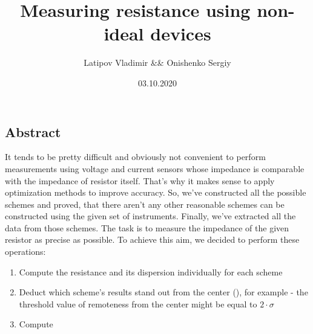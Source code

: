 \documentclass[11pt]{memoir}
\title{\textbf{\Huge{Measuring resistance using non-ideal devices}}}
\date{03.10.2020}
\author{Latipov Vladimir \&\& Onishenko Sergiy}
\begin{document}
    \renewcommand{\thesection}{\arabic{section}}

    \maketitle
    \newpage

    \tableofcontents

    \newpage


    \begin{vplace}
    \begin{center}

    \section{Abstract}\label{sec:abstract}
        It tends to be pretty difficult and obviously not convenient to perform measurements using voltage and current sensors whose impedance is comparable with the impedance of resistor itself.\newline
        That's why it makes sense to apply optimization methods to improve accuracy.\newline
        So, we've constructed all the possible schemes and proved, that there aren't any other reasonable schemes can be constructed using the given set of instruments.\newline
        Finally, we've extracted all the data from those schemes.\newline
        The task is to measure the impedance of the given resistor as precise as possible.\newline
        To achieve this aim, we decided to perform these operations:\newline

        \begin{enumerate}
            \item Compute the resistance and its dispersion individually for each scheme
            \item Deduct which scheme's results stand out from the center (\mu), for example - the threshold value of remoteness from the center might be equal to $2 \cdot \sigma$
            \item Compute 
        \end{enumerate}

    \end{center}
    \end{vplace}
\end{document}

